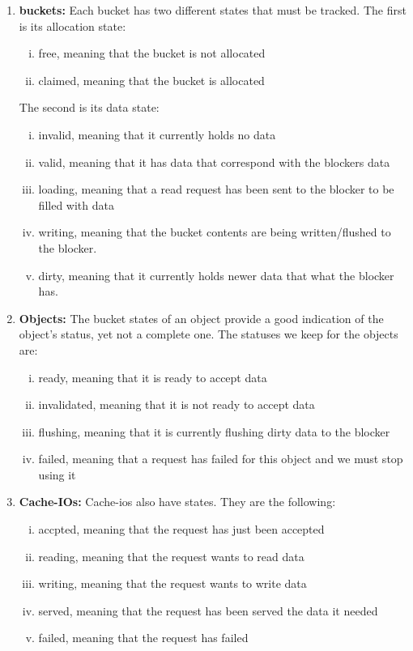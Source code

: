 \begin{enumerate}
\item \textbf{buckets:} Each bucket has two different states that must be 
	tracked. The first is its allocation state:
	\begin{enumerate}[i)]
		\item free, meaning that the bucket is not allocated
		\item claimed, meaning that the bucket is allocated
	\end{enumerate}
	The second is its data state:
	\begin{enumerate}[i)]
		\item invalid, meaning that it currently holds no data
		\item valid, meaning that it has data that correspond with the 
			blockers data
		\item loading, meaning that a read request has been sent to the 
			blocker to be filled with data
		\item writing, meaning that the bucket contents are being 
			written/flushed to the blocker.
		\item dirty, meaning that it currently holds newer data that 
			what the blocker has.
	\end{enumerate}
\item \textbf{Objects:} The bucket states of an object provide a good 
	indication of the object's status, yet not a complete one. The statuses 
	we keep for the objects are:
	\begin{enumerate}[i)]
		\item ready, meaning that it is ready to accept data
		\item invalidated, meaning that it is not ready to accept data
		\item flushing, meaning that it is currently flushing dirty 
			data to the blocker
		\item failed, meaning that a request has failed for this object 
			and we must stop using it
	\end{enumerate}
\item \textbf{Cache-IOs:} Cache-ios also have states. They are the following:
	\begin{enumerate}[i)]
		\item accpted, meaning that the request has just been accepted
		\item reading, meaning that the request wants to read data
		\item writing, meaning that the request wants to write data
		\item served, meaning that the request has been served the data 
			it needed
		\item failed, meaning that the request has failed
	\end{enumerate}
\end{enumerate}


